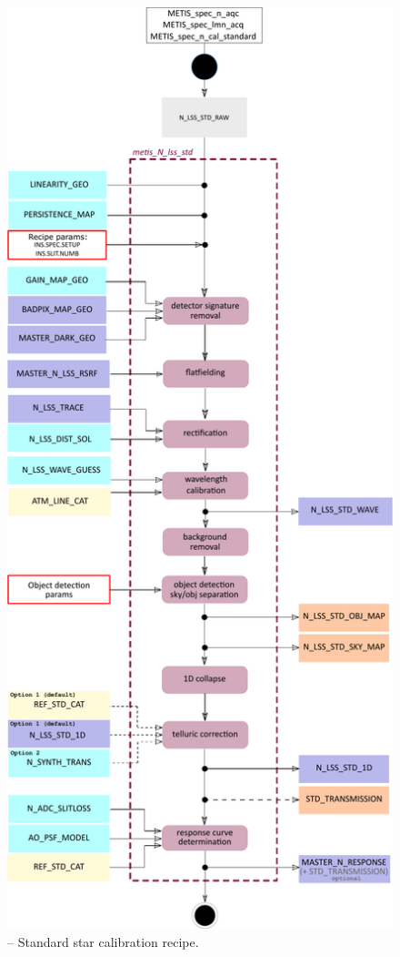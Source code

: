 \begin{figure}[ht]
  \centering
  \includegraphics[width=0.4\textheight]{figures/metis_n_lss_std_v0.83.pdf}
  \caption[Recipe: ]{ --
    Standard star calibration recipe.}
  \label{Fig:rec_n_lss_flux}
\end{figure}
